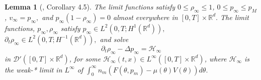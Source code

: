 \documentclass{amsart}
\newtheorem{lemma}[theorem]{Lemma}
\def\R{\mathbb R}
\begin{document}
\begin{lemma}[\cite{david}, Corollary 4.5]\label{weaklemma}
    The limit functions satisfy $0 \leq \rho_\infty \leq 1$, $0 \leq p_\infty \leq p_M$, $v_\infty=p_\infty,$ and $p_\infty(1-\rho_\infty)=0$ almost everywhere in $[0,T]\times \R^d.$ The limit functions, $p_\infty, \rho_\infty$ satisfy $p_\infty \in L^2(0,T;H^1(\R^d)),$ $\partial_t \rho_\infty \in L^2(0,T;H^{-1}(\R^d)),$ and solve
    \begin{equation}\label{lim.eq}
        \partial_t \rho_\infty -\Delta p_\infty =\mathcal{H}_\infty 
    \end{equation}
    in $\mathcal{D}'([0,T]\times\R^d)$,
    for some $\mathcal{H}_\infty(t,x) \in L^\infty([0,T]\times \R^d)$, where $\mathcal{H}_\infty$ is the weak-* limit in $L^\infty$ of $\int_{0}^{\infty}n_m(F(\theta,p_m)-\mu(\theta)V(\theta))d\theta.$
\end{lemma}
\end{document}
